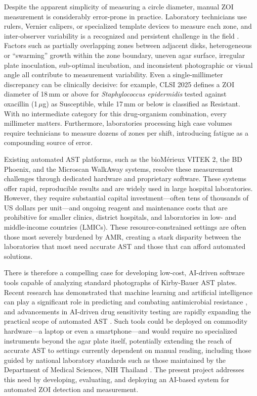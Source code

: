Despite the apparent simplicity of measuring a circle diameter, manual ZOI measurement is
considerably error-prone in practice. Laboratory technicians use rulers, Vernier calipers, or
specialized template devices to measure each zone, and inter-observer variability is a recognized
and persistent challenge in the field \cite{humphries2018}. Factors such as partially overlapping
zones between adjacent disks, heterogeneous or ``swarming'' growth within the zone boundary,
uneven agar surface, irregular plate inoculation, sub-optimal incubation, and inconsistent
photographic or visual angle all contribute to measurement variability. Even a single-millimeter
discrepancy can be clinically decisive: for example, CLSI 2025 defines a ZOI diameter of
18\,mm or above for \textit{Staphylococcus epidermidis} tested against oxacillin (1\,$\mu$g) as
Susceptible, while 17\,mm or below is classified as Resistant. With no intermediate category
for this drug-organism combination, every millimeter matters. Furthermore, laboratories processing
high case volumes require technicians to measure dozens of zones per shift, introducing fatigue
as a compounding source of error.

Existing automated AST platforms, such as the bioM\'{e}rieux VITEK 2, the BD Phoenix, and the
Microscan WalkAway systems, resolve these measurement challenges through dedicated hardware and
proprietary software. These systems offer rapid, reproducible results and are widely used in
large hospital laboratories. However, they require substantial capital investment---often tens
of thousands of US dollars per unit---and ongoing reagent and maintenance costs that are
prohibitive for smaller clinics, district hospitals, and laboratories in low- and middle-income
countries (LMICs). These resource-constrained settings are often those most severely burdened
by AMR, creating a stark disparity between the laboratories that most need accurate AST and
those that can afford automated solutions.

There is therefore a compelling case for developing low-cost, AI-driven software tools capable
of analyzing standard photographs of Kirby-Bauer AST plates. Recent research has demonstrated
that machine learning and artificial intelligence can play a significant role in predicting and
combating antimicrobial resistance \cite{bilal2025}, and advancements in AI-driven drug
sensitivity testing are rapidly expanding the practical scope of automated AST \cite{liao2025}.
Such tools could be deployed on commodity hardware---a laptop or even a smartphone---and would
require no specialized instruments beyond the agar plate itself, potentially extending the reach
of accurate AST to settings currently dependent on manual reading, including those guided by
national laboratory standards such as those maintained by the Department of Medical Sciences,
NIH Thailand \cite{dmsc_nih}. The present project addresses this need by developing, evaluating,
and deploying an AI-based system for automated ZOI detection and measurement.

